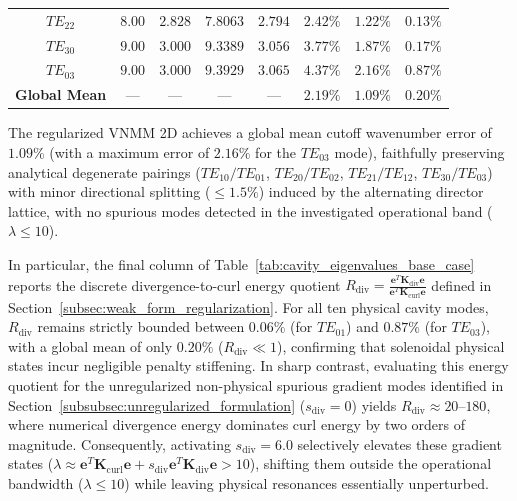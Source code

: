 \documentclass[preprint,12pt]{elsarticle}
\begin{document}
\begin{table}[!htbp]
{\begin{tabular}{@{} c c c c c c c c @{}}
            $TE_{22}$                 & $8.00$                          & $2.828$                      & $7.8063$                  & $2.794$                & $2.42\%$                      & $\mathbf{1.22\%}$         & $0.13\%$                \\
            $TE_{30}$                 & $9.00$                          & $3.000$                      & $9.3389$                  & $3.056$                & $3.77\%$                      & $\mathbf{1.87\%}$         & $0.17\%$                \\
            $TE_{03}$                 & $9.00$                          & $3.000$                      & $9.3929$                  & $3.065$                & $4.37\%$                      & $\mathbf{2.16\%}$         & $0.87\%$                \\
            \midrule
            \textbf{Global Mean}      & ---                             & ---                          & ---                       & ---                    & $\mathbf{2.19\%}$             & $\mathbf{1.09\%}$         & $\mathbf{0.20\%}$       \\
            \bottomrule
        \end{tabular}%
    }
\end{table}

The regularized VNMM 2D achieves a global mean cutoff wavenumber error of $1.09\%$ (with a maximum error of $2.16\%$ for the $TE_{03}$ mode), faithfully preserving analytical degenerate pairings ($TE_{10}/TE_{01}$, $TE_{20}/TE_{02}$, $TE_{21}/TE_{12}$, $TE_{30}/TE_{03}$) with minor directional splitting ($\le 1.5\%$) induced by the alternating director lattice, with no spurious modes detected in the investigated operational band ($\lambda \le 10$).

In particular, the final column of Table~\ref{tab:cavity_eigenvalues_base_case} reports the discrete divergence-to-curl energy quotient $R_{\mathrm{div}} = \frac{\mathbf{e}^T \mathbf{K}_{\mathrm{div}} \mathbf{e}}{\mathbf{e}^T \mathbf{K}_{\mathrm{curl}} \mathbf{e}}$ defined in Section~\ref{subsec:weak_form_regularization}. For all ten physical cavity modes, $R_{\mathrm{div}}$ remains strictly bounded between $0.06\%$ (for $TE_{01}$) and $0.87\%$ (for $TE_{03}$), with a global mean of only $0.20\%$ ($R_{\mathrm{div}} \ll 1$), confirming that solenoidal physical states incur negligible penalty stiffening. In sharp contrast, evaluating this energy quotient for the unregularized non-physical spurious gradient modes identified in Section~\ref{subsubsec:unregularized_formulation} ($s_{\mathrm{div}} = 0$) yields $R_{\mathrm{div}} \approx 20\text{--}180$, where numerical divergence energy dominates curl energy by two orders of magnitude. Consequently, activating $s_{\mathrm{div}} = 6.0$ selectively elevates these gradient states ($\lambda \approx \mathbf{e}^T \mathbf{K}_{\mathrm{curl}} \mathbf{e} + s_{\mathrm{div}} \mathbf{e}^T \mathbf{K}_{\mathrm{div}} \mathbf{e} > 10$), shifting them outside the operational bandwidth ($\lambda \le 10$) while leaving physical resonances essentially unperturbed.
\end{document}
